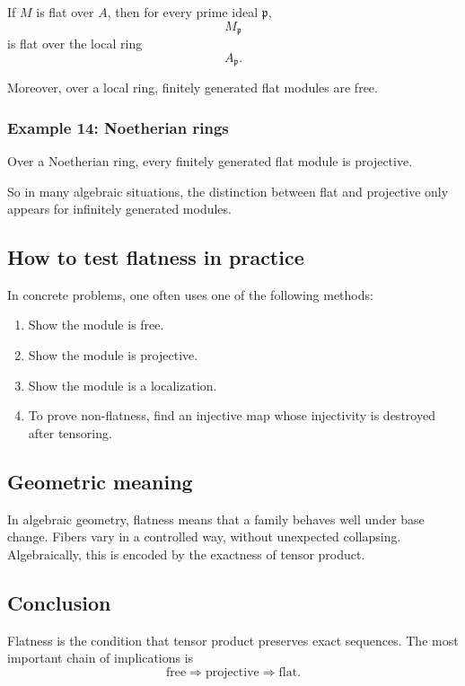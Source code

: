 \documentclass[12pt,a4paper]{article}
\theoremstyle{notespace}
\begin{document}
If \(M\) is flat over \(A\), then for every prime ideal \(\mathfrak p\),
\[
M_{\mathfrak p}
\]
is flat over the local ring
\[
A_{\mathfrak p}.
\]

Moreover, over a local ring, finitely generated flat modules are free.

\subsubsection*{Example 14: Noetherian rings}

Over a Noetherian ring, every finitely generated flat module is projective.

So in many algebraic situations, the distinction between flat and projective only appears for infinitely generated modules.

\subsection{How to test flatness in practice}

In concrete problems, one often uses one of the following methods:

\begin{enumerate}
	\item Show the module is free.
	
	\item Show the module is projective.
	
	\item Show the module is a localization.
	
	\item To prove non-flatness, find an injective map whose injectivity is destroyed after tensoring.
\end{enumerate}

\subsection{Geometric meaning}

In algebraic geometry, flatness means that a family behaves well under base change. Fibers vary in a controlled way, without unexpected collapsing. Algebraically, this is encoded by the exactness of tensor product.

\subsection{Conclusion}

Flatness is the condition that tensor product preserves exact sequences. The most important chain of implications is
\[
\text{free} \Longrightarrow \text{projective} \Longrightarrow \text{flat}.
\]
\end{document}
